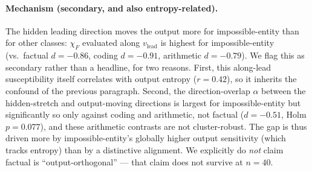 \documentclass{article}
\begin{document}
\paragraph{Mechanism (secondary, and also entropy-related).}
The hidden leading direction moves the output more for impossible-entity than for other classes:
$\chi_F$ evaluated along $v_{\mathrm{lead}}$ is highest for impossible-entity (vs.\ factual
$d=-0.86$, coding $d=-0.91$, arithmetic $d=-0.79$). We flag this as secondary rather than a headline,
for two reasons. First, this along-lead susceptibility itself correlates with output entropy
($r=0.42$), so it inherits the confound of the previous paragraph. Second, the direction-overlap
$\alpha$ between the hidden-stretch and output-moving directions is largest for impossible-entity
but significantly so only against coding and arithmetic, not factual ($d=-0.51$, Holm $p=0.077$), and
these arithmetic contrasts are not cluster-robust. The gap is thus driven more by impossible-entity's
globally higher output sensitivity (which tracks entropy) than by a distinctive alignment. We
explicitly do \emph{not} claim factual is ``output-orthogonal'' --- that claim does not survive at
$n=40$.
\end{document}
